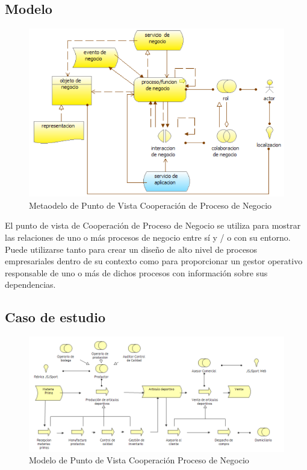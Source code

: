 \subsection{Modelo}
\begin{figure}[th!]
	\centering
	\includegraphics[width=0.6\linewidth]{arquitectura/imagenes/modeloCooperacionProcesoNegocio}
	\caption{Metaodelo de Punto de Vista Cooperación de Proceso de Negocio \cite{pun5}}
	\label{fig:metamodelo de punto de vista de cooperacion proceso de negocio}
\end{figure}
El punto de vista de Cooperación de Proceso de Negocio se utiliza para mostrar las relaciones de uno o más procesos de negocio entre sí y / o con su entorno. Puede utilizarse tanto para crear un diseño de alto nivel de procesos empresariales dentro de su contexto como para proporcionar un gestor operativo responsable de uno o más de dichos procesos con información sobre sus dependencias.

\subsection{Caso de estudio}

\begin{figure}[th!]
	\centering
	\includegraphics[width=0.6\linewidth]{arquitectura/imagenes/VistaCooperacionProcesoNegocio}
	\caption{Modelo de Punto de Vista Cooperación Proceso de Negocio \cite{pun5}}
	\label{fig:Modelo de punto de vista Cooperacion Proceso de Negocio}
\end{figure}

